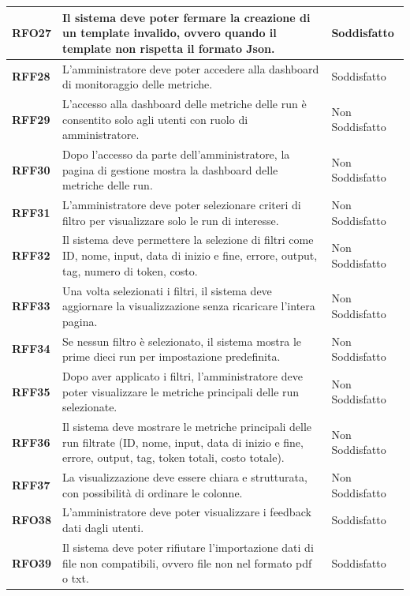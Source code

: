 \begin{longtable}{|>{\centering\arraybackslash}m{}|>{\centering\arraybackslash}m{}|>{\centering\arraybackslash}m{}|}
    \hline
    \textbf{RFO27} & Il sistema deve poter fermare la creazione di un template invalido, ovvero quando il template non rispetta il formato Json. & Soddisfatto \\
    \hline
    \textbf{RFF28} & L'amministratore deve poter accedere alla dashboard di monitoraggio delle metriche. & Soddisfatto \\
    \hline
    \textbf{RFF29} & L’accesso alla dashboard delle metriche delle run è consentito solo agli utenti con ruolo di amministratore. & Non Soddisfatto \\
    \hline
    \textbf{RFF30} & Dopo l’accesso da parte dell'amministratore, la pagina di gestione mostra la dashboard delle metriche delle run. & Non Soddisfatto \\
    \hline
    \textbf{RFF31} & L’amministratore deve poter selezionare criteri di filtro per visualizzare solo le run di interesse. & Non Soddisfatto \\
    \hline
    \textbf{RFF32} & Il sistema deve permettere la selezione di filtri come ID, nome, input, data di inizio e fine, errore, output, tag, numero di token, costo. & Non Soddisfatto \\
    \hline
    \textbf{RFF33} & Una volta selezionati i filtri, il sistema deve aggiornare la visualizzazione senza ricaricare l'intera pagina. & Non Soddisfatto \\
    \hline
    \textbf{RFF34} & Se nessun filtro è selezionato, il sistema mostra le prime dieci run per impostazione predefinita. & Non Soddisfatto \\
    \hline
    \textbf{RFF35} & Dopo aver applicato i filtri, l’amministratore deve poter visualizzare le metriche principali delle run selezionate. & Non Soddisfatto \\
    \hline
    \textbf{RFF36} & Il sistema deve mostrare le metriche principali delle run filtrate (ID, nome, input, data di inizio e fine, errore, output, tag, token totali, costo totale). & Non Soddisfatto \\
    \hline
    \textbf{RFF37} & La visualizzazione deve essere chiara e strutturata, con possibilità di ordinare le colonne. & Non Soddisfatto \\
    \hline
    \textbf{RFO38} & L'amministratore deve poter visualizzare i feedback dati dagli utenti. & Soddisfatto \\
    \hline
    \textbf{RFO39} & Il sistema deve poter rifiutare l'importazione dati di file non compatibili, ovvero file non nel formato pdf o txt. & Soddisfatto \\

\end{longtable}
